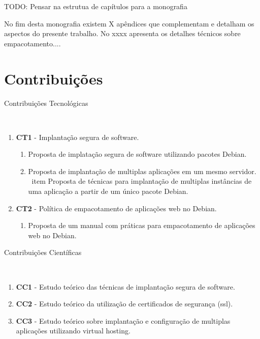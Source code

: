 TODO: Pensar na estrutua de capítulos para a monografia

No fim desta monografia existem X apêndices que complementam e detalham os
aspectos do presente trabalho. No  xxxx apresenta os detalhes
técnicos sobre empacotamento....

\section{Contribuições}
%
\begin{description}
  \item [Contribuições Tecnológicas]\
\end{description}
    \begin{enumerate}
      \item \textbf{CT1} - Implantação segura de software.
        \begin{enumerate}
          \item Proposta de implatação segura de software utilizando pacotes
          Debian.
          \item Proposta de implantação de multiplas aplicações em um mesmo
          servidor.
          \ item Proposta de técnicas para implantação de multiplas instâncias
           de uma aplicação a partir de um único pacote Debian.
        \end{enumerate}
      \item \textbf{CT2} - Política de empacotamento de aplicações web no Debian.
            \begin{enumerate}
              \item  Proposta de um manual com práticas para empacotamento de
              aplicações web no Debian.
            \end{enumerate}
    \end{enumerate}
\begin{description}
  \item [Contribuições Científicas]\
\end{description}
     \begin{enumerate}
      \item \textbf{CC1} - Estudo teórico das técnicas de implantação segura de
      software.
      \item \textbf{CC2} - Estudo teórico da utilização de certificados de
      segurança (ssl).
      \item \textbf{CC3} - Estudo teórico sobre implantação e configuração de
      multiplas aplicações utilizando virtual hosting.
     \end{enumerate}

